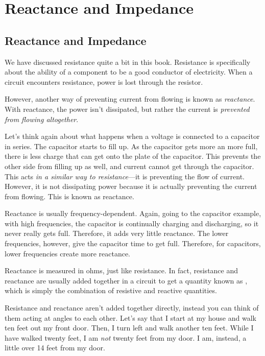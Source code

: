 \chapter{Reactance and Impedance}
\label{chapImpedance}

\section{Reactance and Impedance}

We have discussed resistance quite a bit in this book.  
Resistance is specifically about the ability of a component to be a good conductor of electricity.
When a circuit encounters resistance, power is lost through the resistor.

However, another way of preventing current from flowing is known as \emph{reactance}.
With reactance, the power isn't dissipated, but rather the current is \emph{prevented from flowing altogether}.

Let's think again about what happens when a voltage is connected to a capacitor in series.
The capacitor starts to fill up.
As the capacitor gets more an more full, there is less charge that can get onto the plate of the capacitor.
This prevents the other side from filling up as well, and current cannot get through the capacitor.
This acts \emph{in a similar way to resistance}---it is preventing the flow of current.
However, it is not dissipating power because it is actually preventing the current from flowing.
This is known as reactance.

Reactance is usually frequency-dependent.
Again, going to the capacitor example, with high frequencies, the capacitor is continually charging and discharging, so it never really gets full.
Therefore, it adds very little reactance.
The lower frequencies, however, give the capacitor time to get full.
Therefore, for capacitors, lower frequencies create more reactance.

Reactance is measured in ohms, just like resistance.  
In fact, resistance and reactance are usually added together in a circuit to get a quantity known as , which is simply the combination of resistive and reactive quantities.

Resistance and reactance aren't added together directly, instead you can think of them acting at angles to each other.
Let's say that I start at my house and walk ten feet out my front door.
Then, I turn left and walk another ten feet.
While I have walked twenty feet, I am \emph{not} twenty feet from my door.
I am, instead, a little over 14 feet from my door.





